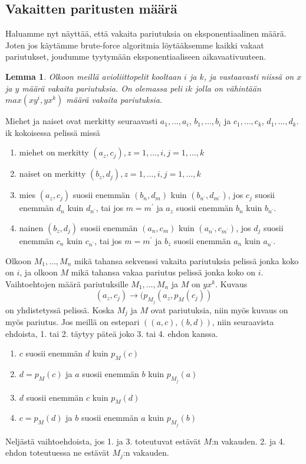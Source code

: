 \documentclass[finnish]{tktltiki2}
\newtheorem{lem}[lau]{Lemma}
\theoremstyle{definition}
\theoremstyle{remark}
\begin{document}
\subsection{Vakaitten paritusten määrä}
Haluamme nyt näyttää, että vakaita pariutuksia on eksponentiaalinen määrä. Joten jos käytämme brute-force algoritmia löytääksemme kaikki vakaat pariutukset, joudumme tyytymään eksponentiaaliseen aikavaativuuteen.
\begin{lem}
Olkoon meillä avioliittopelit kooltaan $i$ ja $k$, ja vastaavasti niissä on $x$ ja $y$ määrä vakaita pariutuksia. On olemassa peli $ik$ jolla on vähintään $max(xy^{i}, yx^{k})$ määrä vakaita pariutuksia.
\end{lem}
Miehet ja naiset ovat merkitty seuraavasti $a_{1},\ldots, a_{i}$, $b_{1},\ldots,b_{i}$ ja $c_{1},\ldots,c_{k}$, $d_{1},\ldots,d_{k}$. ik kokoisessa pelissä missä
\begin{enumerate}
	\item miehet on merkitty $(a_{z}, c_{j}), z = 1,\ldots,i, j = 1,\ldots,k$
	\item naiset on merkitty $(b_{z}, d_{j}), z = 1,\ldots,i, j = 1,\ldots,k$
	\item mies $(a_{z}, c_{j})$ suosii enemmän $(b_{n}, d_{m})$ kuin $(b_{n^{'}}, d_{m^{'}})$, jos $c_{j}$ suosii enemmän $d_{n}$ kuin $d_{n^{'}}$, tai jos $m = m^{'}$ ja $a_{z}$ suosii enemmän $b_{n}$ kuin $b_{n^{'}}$.
	\item nainen $(b_{z}, d_{j})$ suosii enemmän $(a_{n}, c_{m})$ kuin $(a_{n^{'}}, c_{m^{'}})$, jos $d_{j}$ suosii enemmän $c_{n}$ kuin $c_{n^{'}}$, tai jos $m = m^{'}$ ja $b_{z}$ suosii enemmän $a_{n}$ kuin $a_{n^{'}}$. 
\end{enumerate}

Olkoon $M_1,\ldots,M_n$ mikä tahansa sekvenssi vakaita pariutuksia pelissä jonka koko on $i$, ja olkoon $M$ mikä tahansa vakaa pariutus pelissä jonka koko on $i$. Vaihtoehtojen määrä pariutuksille $M_1,\ldots,M_n$ ja $M$ on $yx^{k}$. Kuvaus
$$ (a_{z}, c_{j}) \longrightarrow (p_{M_{j}}(a_{z},p_{M}(c_{j})) $$
on yhdistetyssä pelissä.
Koska $M_j$ ja $M$ ovat pariutuksia, niin myös kuvaus on myös pariutus. Jos meillä on estepari $((a, c), (b, d))$, niin seuraavista ehdoista, 1. tai 2. täytyy päteä joko 3. tai 4. ehdon kanssa.

\begin{enumerate}
	\item $c$ suosii enemmän $d$ kuin $p_M(c)$
	\item $d = p_M(c)$ ja $a$ suosii enemmän $b$ kuin $p_{M_{j}}(a)$
	\item $d$ suosii enemmän $c$ kuin $p_M(d)$
	\item $c = p_M(d)$ ja $b$ suosii enemmän $a$ kuin $p_{M_{j}}(b)$
\end{enumerate}
Neljästä vaihtoehdoista, jos 1. ja 3. toteutuvat estävät $M$:n vakauden. 2. ja 4. ehdon toteutuessa ne estävät $M_{j}$:n vakauden.
\end{document}
